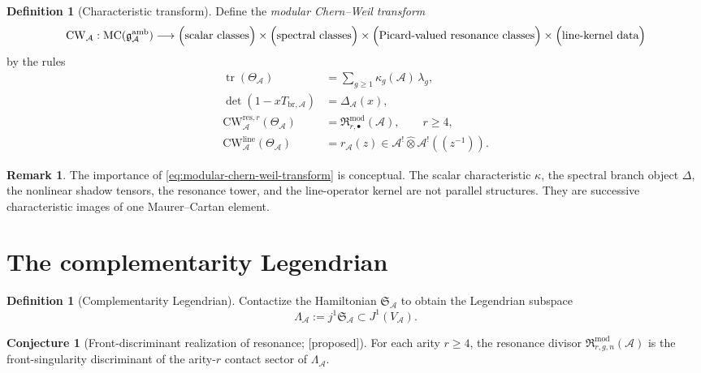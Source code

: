 \documentclass[11pt,oneside]{memoir}
\numberwithin{equation}{chapter}
\theoremstyle{definition}
\newtheorem{definition}[theorem]{Definition}
\newtheorem{conjecture}[theorem]{Conjecture}
\newtheorem{remark}[theorem]{Remark}
\newcommand{\ClaimStatusConjectured}{\textnormal{[proposed]}}
\newcommand{\cA}{\mathcal A}
\newcommand{\fg}{\mathfrak g}
\newcommand{\hot}{\widehat\otimes}
\newcommand{\la}{\lambda}
\newcommand{\MC}{\operatorname{MC}}
\newcommand{\tr}{\operatorname{tr}}
\begin{document}
\begin{definition}[Characteristic transform]
\label{def:modular-chern-weil-transform}
Define the \emph{modular Chern--Weil transform}
\begin{equation}
\label{eq:modular-chern-weil-transform}
\mathrm{CW}_{\cA}:\MC(\fg^{\mathrm{amb}}_{\cA})\longrightarrow
\Bigl(\text{scalar classes}\Bigr)
\times
\Bigl(\text{spectral classes}\Bigr)
\times
\Bigl(\text{Picard-valued resonance classes}\Bigr)
\times
\Bigl(\text{line-kernel data}\Bigr)
\end{equation}
by the rules
\begin{align}
\tr(\Theta_{\cA})
&=
\sum_{g\ge 1}\kappa_g(\cA)\,\la_g,
\label{eq:scalar-shadow-cw}
\\
\det(1-xT_{\mathrm{br},\cA})
&=
\Delta_{\cA}(x),
\label{eq:spectral-shadow-cw}
\\
\mathrm{CW}_{\cA}^{\mathrm{res},r}(\Theta_{\cA})
&=
\mathfrak R^{\mathrm{mod}}_{r,\bullet}(\cA),
\qquad r\ge 4,
\label{eq:resonance-shadow-cw}
\\
\mathrm{CW}_{\cA}^{\mathrm{line}}(\Theta_{\cA})
&=
 r_{\cA}(z)\in \cA^!\hot \cA^!((z^{-1})).
\label{eq:line-shadow-cw}
\end{align}
\end{definition}

\begin{remark}
The importance of \eqref{eq:modular-chern-weil-transform} is conceptual.  The scalar characteristic \(\kappa\), the spectral branch object \(\Delta\), the nonlinear shadow tensors, the resonance tower, and the line-operator kernel are not parallel structures.  They are successive characteristic images of one Maurer--Cartan element.
\end{remark}

\section{The complementarity Legendrian}

\begin{definition}[Complementarity Legendrian]
\label{def:complementarity-legendrian}
Contactize the Hamiltonian \(\mathfrak S_{\cA}\) to obtain the Legendrian subspace
\begin{equation}
\label{eq:complementarity-legendrian}
\Lambda_{\cA}:=j^1\mathfrak S_{\cA}\subset J^1(V_{\cA}).
\end{equation}
\end{definition}

\begin{conjecture}[Front-discriminant realization of resonance; \ClaimStatusConjectured]
\label{conj:front-discriminant-resonance}
For each arity \(r\ge 4\), the resonance divisor \(\mathfrak R^{\mathrm{mod}}_{r,g,n}(\cA)\) is the front-singularity discriminant of the arity-\(r\) contact sector of \(\Lambda_{\cA}\).
\end{conjecture}
\end{document}
